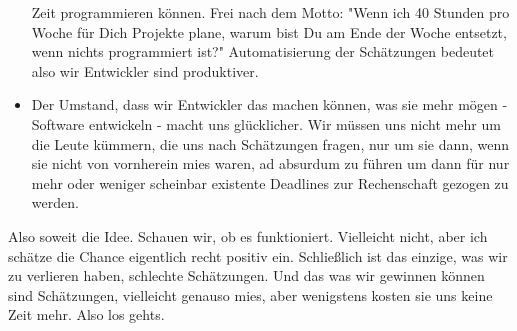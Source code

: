 \begin{itemize}
    Zeit programmieren können. Frei nach dem Motto: 
    "Wenn ich 40 Stunden pro Woche für Dich Projekte plane, warum bist Du am Ende 
    der Woche entsetzt, wenn nichts programmiert ist?" 
    Automatisierung der Schätzungen bedeutet also wir Entwickler sind produktiver.
\item
    Der Umstand, dass wir Entwickler das machen können, was sie mehr mögen - Software 
    entwickeln - macht uns glücklicher. 
    Wir müssen uns nicht mehr um die Leute kümmern, die uns nach  Schätzungen fragen, 
    nur um sie dann, wenn sie nicht von vornherein mies waren, ad absurdum zu führen 
    um dann für nur mehr oder weniger scheinbar existente Deadlines zur Rechenschaft 
    gezogen zu werden.
\end{itemize}

Also soweit die Idee. 
Schauen wir, ob es funktioniert. 
Vielleicht nicht, aber ich schätze die Chance eigentlich recht positiv ein. 
Schließlich ist das einzige, was wir zu verlieren haben, schlechte Schätzungen. 
Und das was wir gewinnen können sind Schätzungen, vielleicht genauso mies, 
aber wenigstens kosten sie uns keine Zeit mehr. 
Also los gehts.

